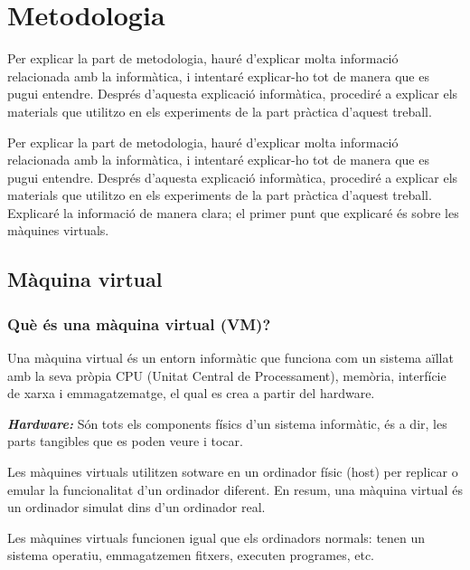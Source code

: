 \chapter{Metodologia}
Per explicar la part de metodologia, hauré d'explicar molta informació relacionada amb la informàtica, i intentaré explicar-ho tot de manera que es pugui entendre. Després d’aquesta explicació informàtica, procediré a explicar els materials que utilitzo en els experiments de la part pràctica d’aquest treball.
\vspace{0.3truecm}

Per explicar la part de metodologia, hauré d’explicar molta informació relacionada amb la informàtica, i intentaré explicar-ho tot de manera que es pugui entendre. Després d’aquesta explicació informàtica, procediré a explicar els materials que utilitzo en els experiments de la part pràctica d’aquest treball.\\

Explicaré la informació de manera clara; el primer punt que explicaré és sobre les màquines virtuals.

\section{Màquina virtual}
\subsection{Què és una màquina virtual (VM)?}
Una màquina virtual és un entorn informàtic que funciona com un sistema aïllat amb la seva pròpia CPU (Unitat Central de Processament), memòria, interfície de xarxa i emmagatzematge, el qual es crea a partir del hardware.

\textit{\textbf{Hardware:}} Són tots els components físics d’un sistema informàtic, és a dir, les parts tangibles que es poden veure i tocar.

Les màquines virtuals utilitzen sotware en un ordinador físic (host) per replicar o emular la funcionalitat d’un ordinador diferent. En resum, una màquina virtual és un ordinador simulat dins d’un ordinador real.

Les màquines virtuals funcionen igual que els ordinadors normals: tenen un sistema operatiu, emmagatzemen fitxers, executen programes, etc.

